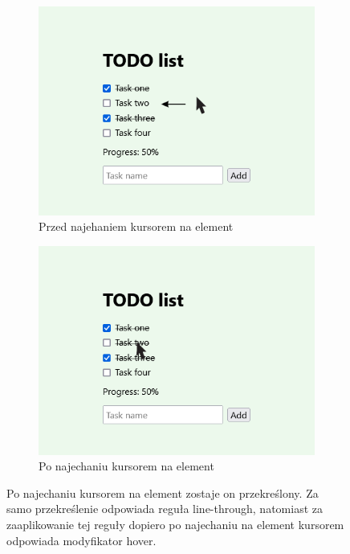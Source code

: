 \documentclass{SGGW-thesis}
\begin{document}
\begin{figure}[h]
    \centering
    \begin{subfigure}{.5\textwidth}
    \centering
    \includegraphics[width=.9\linewidth]{test-app-2.png}
    \caption{Przed najehaniem kursorem na element}
    \label{fig:sub1}
    \end{subfigure}%
    \begin{subfigure}{.5\textwidth}
    \centering
    \includegraphics[width=.9\linewidth]{test-app-3.png}
    \caption{Po najechaniu kursorem na element}
    \label{fig:sub2}
    \end{subfigure}
    \caption{Po najechaniu kursorem na element zostaje on przekreślony. Za samo przekreślenie odpowiada reguła line-through, natomiast za zaaplikowanie tej reguły dopiero po najechaniu na element kursorem odpowiada modyfikator hover.}
    \label{fig:test}
\end{figure}
\end{document}

